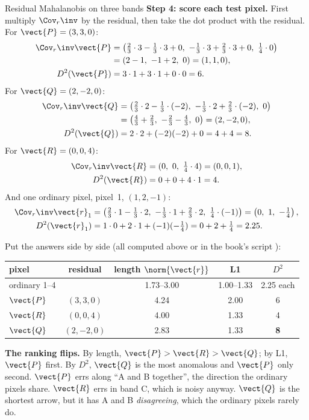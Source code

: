 \begin{worked}[label={we:residualmaha:three}]{Residual Mahalanobis on three bands}
\textbf{Step 4: score each test pixel.} First multiply $\Cov_r\inv$ by the residual, then take the dot product
with the residual. For $\vect{P}=(3,3,0)$:
\begin{align*}
\Cov_r\inv\vect{P} &= \left(\tfrac23\cdot3-\tfrac13\cdot3+0,\ -\tfrac13\cdot3+\tfrac23\cdot3+0,\ \tfrac14\cdot0\right)\\
&= (2-1,\ -1+2,\ 0) = (1,1,0),\\
D^2(\vect{P}) &= 3\cdot1+3\cdot1+0\cdot0 = 6.
\end{align*}
For $\vect{Q}=(2,-2,0)$:
\begin{align*}
\Cov_r\inv\vect{Q} &= \left(\tfrac23\cdot2-\tfrac13\cdot(-2),\ -\tfrac13\cdot2+\tfrac23\cdot(-2),\ 0\right)\\
&= \left(\tfrac43+\tfrac23,\ -\tfrac23-\tfrac43,\ 0\right) = (2,-2,0),\\
D^2(\vect{Q}) &= 2\cdot2+(-2)(-2)+0 = 4+4 = 8.
\end{align*}
For $\vect{R}=(0,0,4)$:
\begin{align*}
\Cov_r\inv\vect{R} &= (0,\ 0,\ \tfrac14\cdot4) = (0,0,1),\\
D^2(\vect{R}) &= 0+0+4\cdot1 = 4.
\end{align*}
And one ordinary pixel, pixel~1, $(1,2,-1)$:
\begin{align*}
\Cov_r\inv\vect{r}_1 &= \left(\tfrac23\cdot1-\tfrac13\cdot2,\ -\tfrac13\cdot1+\tfrac23\cdot2,\ \tfrac14\cdot(-1)\right)
 = \left(0,\ 1,\ -\tfrac14\right),\\
D^2(\vect{r}_1) &= 1\cdot0+2\cdot1+(-1)(-\tfrac14) = 0+2+\tfrac14 = 2.25.
\end{align*}
\end{worked}

Put the answers side by side (all computed above or in the book's script \tagC):
\begin{center}\small
\begin{tabular}{@{}lcccc@{}}
\toprule
pixel & residual & length $\norm{\vect{r}}$ & L1 & $D^2$\\
\midrule
ordinary 1--4 & & 1.73--3.00 & 1.00--1.33 & 2.25 each\\
$\vect{P}$ & $(3,3,0)$ & 4.24 & 2.00 & 6\\
$\vect{R}$ & $(0,0,4)$ & 4.00 & 1.33 & 4\\
$\vect{Q}$ & $(2,-2,0)$ & 2.83 & 1.33 & \textbf{8}\\
\bottomrule
\end{tabular}
\end{center}
\textbf{The ranking flips.} By length, $\vect{P}>\vect{R}>\vect{Q}$; by L1, $\vect{P}$ first. By $D^2$,
$\vect{Q}$ is the most anomalous and $\vect{P}$ only second. $\vect{P}$ errs along ``A and B together'', the
direction the ordinary pixels share. $\vect{R}$ errs in band C, which is noisy anyway. $\vect{Q}$ is the
shortest arrow, but it has A and B \emph{disagreeing}, which the ordinary pixels rarely do.

